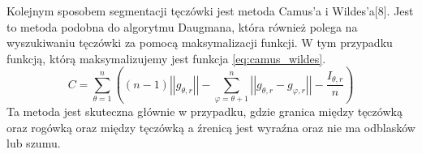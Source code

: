 Kolejnym sposobem segmentacji tęczówki jest metoda Camus'a i Wildes'a[8]. Jest to metoda podobna do algorytmu Daugmana, która również polega na wyszukiwaniu tęczówki za pomocą maksymalizacji funkcji. W tym przypadku funkcją, którą maksymalizujemy jest funkcja \ref{eq:camus_wildes}. 
\begin{equation}
\label{eq:camus_wildes}
C=\sum_{\theta =1}^{n} ((n-1)\left|\left| g_{\theta,r} \right|\right| - \sum_{\varphi=\theta + 1 } ^{n} \left| \left| g_{\theta,r} - g_{\varphi,r} \right| \right| - \frac{I_{\theta,r}}{n}  )
\end{equation}
Ta metoda jest skuteczna głównie w przypadku, gdzie granica między tęczówką oraz rogówką oraz między tęczówką a źrenicą jest wyraźna oraz nie ma odblasków lub szumu.














